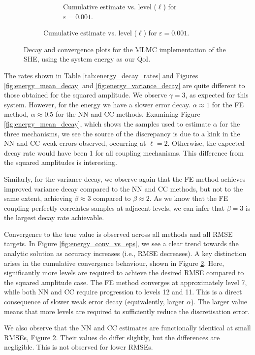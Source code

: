 \begin{figure}[htbp]
\begin{subfigure}{\textwidth}
\begin{subfigure}[b]{\textwidth}
            \caption{Cumulative estimate vs. level ($\ell$) for $\varepsilon=0.001$.}
            \label{fig:energy_cumulative_conv}
        \end{subfigure}
    \end{subfigure}
    \caption{Decay and convergence plots for the MLMC implementation of the SHE,
    using the system energy as our QoI.}
    \label{fig:she_validation_combined}
\end{figure}


The rates shown in Table \ref{tab:energy_decay_rates} and Figures 
\ref{fig:energy_mean_decay} and \ref{fig:energy_variance_decay} 
are quite different to those obtained for the squared amplitude. 
We observe $\gamma = 3$, as expected for this system. However, 
for the energy we have a slower error decay. $\alpha \approx 1$ for the 
FE method, $\alpha \approx 0.5$ for the NN and CC methods. Examining 
Figure \ref{fig:energy_mean_decay}, which shows the samples used to estimate 
$\alpha$ for the three mechanisms, we see the source of the discrepancy is 
due to a kink in the NN and CC weak errors observed, occurring at $\ell = 2$. 
Otherwise, the expected decay rate would have been 1 for all coupling mechanisms.
This difference from the squared amplitudes is interesting.

Similarly, for the variance decay, we observe again that the FE method
achieves improved variance decay compared to the NN and CC methods, but 
not to the same extent, achieving $\beta \approx 3$ compared to 
$\beta \approx 2$. As we know that the 
FE coupling perfectly correlates samples at adjacent levels, we 
can infer that $\beta = 3$ is the largest decay rate achievable.

Convergence to the true value is observed across all methods 
and all RMSE targets. In Figure \ref{fig:energy_conv_vs_eps}, 
we see a clear trend towards the analytic 
solution as accuracy increases (i.e., RMSE decreases). A key 
distinction arises in 
the cumulative convergence behaviour, shown in Figure 
\ref{fig:energy_cumulative_conv}. Here, significantly more levels 
are required to achieve the desired RMSE compared to the squared
amplitude case. The FE method converges at approximately 
level 7, while both NN and CC require progression to levels 
12 and 11. This is a direct consequence of slower 
weak error decay (equivalently, larger $\alpha$). 
The larger value means that more levels are required to 
sufficiently reduce the discretisation error.

We also observe that the NN and CC estimates are functionally identical
at small RMSEs, Figure \ref{fig:energy_cumulative_conv}. Their values 
do differ slightly, but the differences 
are negligible. This is not observed for lower RMSEs.

